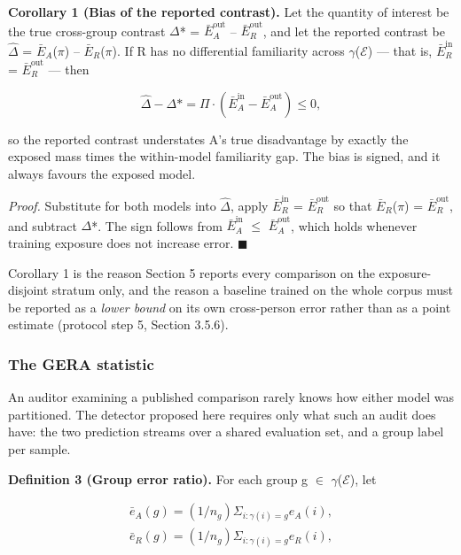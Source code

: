 \textbf{Corollary 1 (Bias of the reported contrast).} Let the quantity of interest be the true cross-group contrast $\Delta$* = $\bar{E}_{A}^{\mathrm{out}}$ -- $\bar{E}_{R}^{\mathrm{out}}$, and let the reported contrast be $\hat{\Delta }$ = $\bar{E}_{A}$($\pi$) -- $\bar{E}_{R}$($\pi$). If R has no differential familiarity across $\gamma$($\mathcal{E}$) --- that is, $\bar{E}_{R}^{\mathrm{in}}$ = $\bar{E}_{R}^{\mathrm{out}}$ --- then

\begin{equation}
\label{eq:41}
\hat{\Delta } - \Delta * = \Pi \cdot ( \bar{E}_A^{\mathrm{in}} - \bar{E}_A^{\mathrm{out}} ) \leq 0,
\end{equation}

so the reported contrast understates A's true disadvantage by exactly the exposed mass times the within-model familiarity gap. The bias is signed, and it always favours the exposed model.

\emph{Proof.} Substitute  for both models into $\hat{\Delta }$, apply $\bar{E}_{R}^{\mathrm{in}}$ = $\bar{E}_{R}^{\mathrm{out}}$ so that $\bar{E}_{R}$($\pi$) = $\bar{E}_{R}^{\mathrm{out}}$, and subtract $\Delta$*. The sign follows from $\bar{E}_{A}^{\mathrm{in}}$ $\leq$ $\bar{E}_{A}^{\mathrm{out}}$, which holds whenever training exposure does not increase error. $\blacksquare$

Corollary 1 is the reason Section 5 reports every comparison on the exposure-disjoint stratum only, and the reason a baseline trained on the whole corpus must be reported as a \emph{lower bound} on its own cross-person error rather than as a point estimate (protocol step 5, Section 3.5.6).

\subsubsection{The GERA statistic}

An auditor examining a published comparison rarely knows how either model was partitioned. The detector proposed here requires only what such an audit does have: the two prediction streams over a shared evaluation set, and a group label per sample.

\textbf{Definition 3 (Group error ratio).} For each group g $\in$ $\gamma$($\mathcal{E}$), let

\begin{equation}
\label{eq:42}
\begin{aligned}
\bar{e}_A(g) = (1/n_g) \Sigma _{i : \gamma (i) = g} e_A(i), \\
\bar{e}_R(g) = (1/n_g) \Sigma _{i : \gamma (i) = g} e_R(i),
\end{aligned}
\end{equation}

